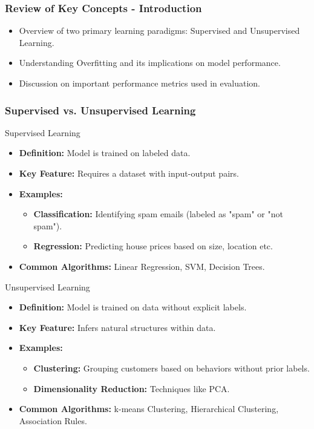 \documentclass[aspectratio=169]{beamer}
\begin{document}
\begin{frame}[fragile]
    \frametitle{Review of Key Concepts - Introduction}
    \begin{itemize}
        \item Overview of two primary learning paradigms: Supervised and Unsupervised Learning.
        \item Understanding Overfitting and its implications on model performance.
        \item Discussion on important performance metrics used in evaluation.
    \end{itemize}
\end{frame}

\begin{frame}[fragile]
    \frametitle{Supervised vs. Unsupervised Learning}
    \begin{block}{Supervised Learning}
        \begin{itemize}
            \item \textbf{Definition:} Model is trained on labeled data.
            \item \textbf{Key Feature:} Requires a dataset with input-output pairs.
            \item \textbf{Examples:}
                \begin{itemize}
                    \item \textbf{Classification:} Identifying spam emails (labeled as "spam" or "not spam").
                    \item \textbf{Regression:} Predicting house prices based on size, location etc.
                \end{itemize}
            \item \textbf{Common Algorithms:} Linear Regression, SVM, Decision Trees.
        \end{itemize}
    \end{block}

    \begin{block}{Unsupervised Learning}
        \begin{itemize}
            \item \textbf{Definition:} Model is trained on data without explicit labels.
            \item \textbf{Key Feature:} Infers natural structures within data.
            \item \textbf{Examples:}
                \begin{itemize}
                    \item \textbf{Clustering:} Grouping customers based on behaviors without prior labels.
                    \item \textbf{Dimensionality Reduction:} Techniques like PCA.
                \end{itemize}
            \item \textbf{Common Algorithms:} k-means Clustering, Hierarchical Clustering, Association Rules.
        \end{itemize}
    \end{block}
\end{frame}
\end{document}
